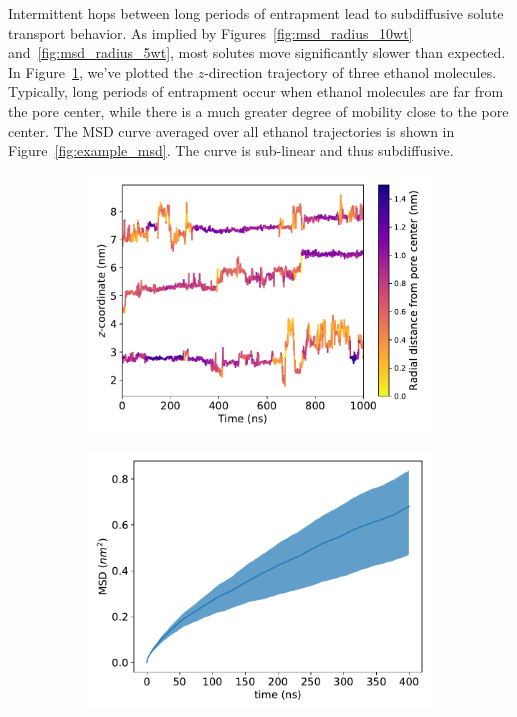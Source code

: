 \documentclass{article}
\begin{document}
  Intermittent hops between long periods of entrapment lead to subdiffusive
  solute transport behavior. As implied by Figures~\ref{fig:msd_radius_10wt} and~\ref{fig:msd_radius_5wt}, 
  most solutes move significantly slower than expected. In 
  Figure~\ref{fig:example_ztraces}, we've plotted the $z$-direction trajectory
  of three ethanol molecules. Typically, long periods of entrapment occur
  when ethanol molecules are far from the pore center, while there is a much 
  greater degree of mobility close to the pore center. The MSD curve averaged
  over all ethanol trajectories is shown in Figure~\ref{fig:example_msd}.
  The curve is sub-linear and thus subdiffusive.
  
  \begin{figure}
  \centering
  \begin{subfigure}{0.49\linewidth}
  \includegraphics[width=\linewidth]{colorful_example_ztraces.pdf}
  \caption{}\label{fig:example_ztraces}
  \end{subfigure}
  \begin{subfigure}{0.49\linewidth}
  \includegraphics[width=\linewidth]{example_msd.pdf}

\end{subfigure}
\end{figure}
\end{document}
